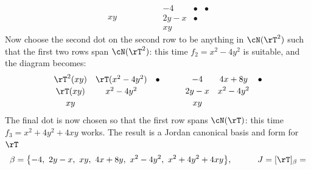 \begin{example}{}{}
\[\begin{matrix}
xy&&
\end{matrix}\qquad\quad\begin{matrix}
-4&\bullet&\bullet\\[2pt]
2y-x&\bullet&\\[2pt]
xy&&
\end{matrix}\]
Now choose the second dot on the second row to be anything in $\cN(\rT^2)$ such that the first two rows span $\cN(\rT^2)$: this time $f_2=x^2-4y^2$ is suitable, and the diagram becomes:
\[\begin{matrix}
\rT^2(xy)&\rT(x^2-4y^2)&\bullet\\[2pt]
\rT(xy)&x^2-4y^2&\\[2pt]
xy&&
\end{matrix}\qquad\quad\begin{matrix}
-4&4x+8y&\bullet\\[2pt]
2y-x&x^2-4y^2&\\[2pt]
xy&&
\end{matrix}\]
The final dot is now chosen so that the first row spans $\cN(\rT)$: this time $f_3=x^2+4y^2+4xy$ works. The result is a Jordan canonical basis and form for $\rT$
\[\beta=\bigl\{-4,\ 2y-x,\ xy,\ 4x+8y,\ x^2-4y^2,\ x^2+4y^2+4xy\bigr\},\quad\qquad J=[\rT]_\beta=
\]
\end{example}
